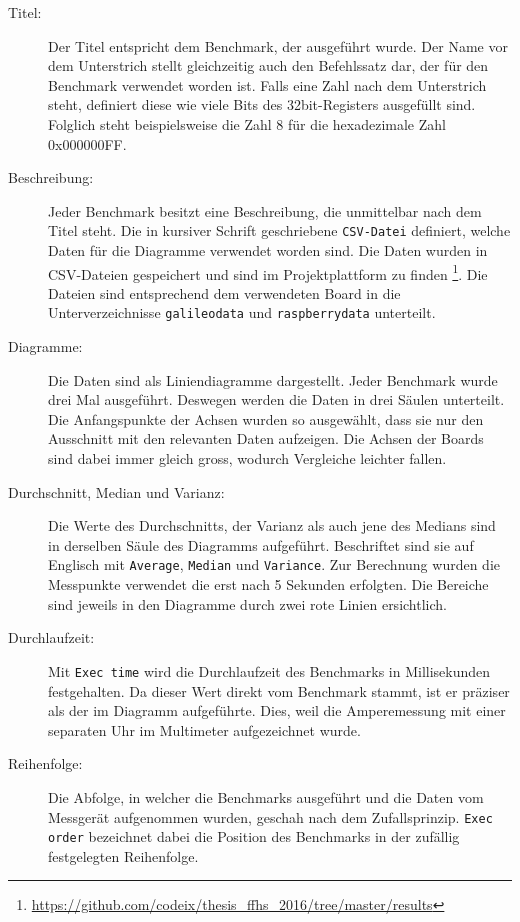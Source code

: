 \begin{description}
\item[Titel:]
Der Titel entspricht dem Benchmark, der ausgeführt wurde. Der Name vor dem Unterstrich stellt gleichzeitig auch den Befehlssatz dar, der für den Benchmark verwendet worden ist. Falls eine Zahl nach dem Unterstrich steht, definiert diese wie viele Bits des 32bit-Registers ausgefüllt sind. Folglich steht beispielsweise die Zahl 8 für die hexadezimale Zahl 0x000000FF.
\item[Beschreibung:]
Jeder Benchmark besitzt eine Beschreibung, die unmittelbar nach dem Titel steht. Die in kursiver Schrift geschriebene \texttt{CSV-Datei} definiert, welche Daten für die Diagramme verwendet worden sind. Die Daten wurden in CSV-Dateien gespeichert und sind im Projektplattform zu finden \footnote{\url{https://github.com/codeix/thesis_ffhs_2016/tree/master/results}}. Die Dateien sind entsprechend dem verwendeten Board in die Unterverzeichnisse \texttt{galileodata} und \texttt{raspberrydata} unterteilt. 
\item[Diagramme:]
Die Daten sind als Liniendiagramme dargestellt. Jeder Benchmark wurde drei Mal ausgeführt. Deswegen werden die Daten in drei Säulen unterteilt. Die Anfangspunkte der Achsen wurden so ausgewählt, dass sie nur den Ausschnitt mit den relevanten Daten aufzeigen. Die Achsen der Boards sind dabei immer gleich gross, wodurch Vergleiche leichter fallen.
\item[Durchschnitt, Median und Varianz:]
Die Werte des Durchschnitts, der Varianz als auch jene des Medians sind in derselben Säule des Diagramms aufgeführt. Beschriftet sind sie auf Englisch mit \texttt{Average}, \texttt{Median} und \texttt{Variance}. Zur Berechnung wurden die Messpunkte verwendet die erst nach 5 Sekunden erfolgten. Die Bereiche sind jeweils in den Diagramme durch zwei rote Linien ersichtlich.
\item[Durchlaufzeit:]
Mit \texttt{Exec time} wird die Durchlaufzeit des Benchmarks in Millisekunden festgehalten. Da dieser Wert direkt vom Benchmark stammt, ist er präziser als der im Diagramm aufgeführte. Dies, weil die Amperemessung mit einer separaten Uhr im Multimeter aufgezeichnet wurde.
\item[Reihenfolge:] Die Abfolge, in welcher die Benchmarks ausgeführt und die Daten vom Messgerät aufgenommen wurden, geschah nach dem Zufallsprinzip. \texttt{Exec order} bezeichnet dabei die Position des Benchmarks in der zufällig festgelegten Reihenfolge.

\end{description}

